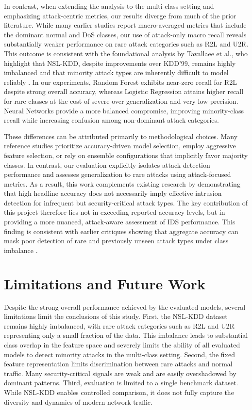 In contrast, when extending the analysis to the multi-class setting and emphasizing attack-centric metrics, our results diverge from much of the prior literature. While many 
earlier studies report macro-averaged metrics that include the dominant normal and DoS classes, our use of attack-only macro recall reveals substantially weaker performance 
on rare attack categories such as R2L and U2R. This outcome is consistent with the foundational analysis by Tavallaee et al., who highlight that NSL-KDD, despite improvements 
over KDD’99, remains highly imbalanced and that minority attack types are inherently difficult to model reliably \cite{tavallaee2009detailed}. In our experiments, Random Forest 
exhibits near-zero recall for R2L despite strong overall accuracy, whereas Logistic Regression attains higher recall for rare classes at the cost of severe over-generalization 
and very low precision. Neural Networks provide a more balanced compromise, improving minority-class recall while increasing confusion among non-dominant attack categories.

These differences can be attributed primarily to methodological choices. Many reference studies prioritize accuracy-driven model selection, employ aggressive feature selection, 
or rely on ensemble configurations that implicitly favor majority classes. In contrast, our evaluation explicitly isolates attack detection performance and assesses generalization 
to rare attacks using attack-focused metrics. As a result, this work complements existing research by demonstrating that high headline accuracy does not necessarily imply effective 
intrusion detection for infrequent but security-critical attack types. The key contribution of this project therefore lies not in exceeding reported accuracy levels, but in providing 
a more nuanced, attack-aware assessment of IDS performance. This finding is consistent with earlier critiques showing that aggregate accuracy can mask poor detection of rare and 
previously unseen attack types under class imbalance \cite{tavallaee2009detailed}.

\pagebreak
\section{Limitations and Future Work}

Despite the strong overall performance achieved by the evaluated models, several limitations limit the conclusions of this study. First, the NSL-KDD dataset remains highly 
imbalanced, with rare attack categories such as R2L and U2R representing only a small fraction of the data. This imbalance leads to substantial class overlap in the feature 
space and severely limits the ability of all evaluated models to detect minority attacks in the multi-class setting. Second, the fixed feature representation limits discrimination between rare attacks and normal traffic. Many security-critical signals are weak and are easily overshadowed by dominant patterns. Third, evaluation is limited 
to a single benchmark dataset. While NSL-KDD enables controlled comparison, it does not fully capture the diversity and dynamics of modern network traffic.

